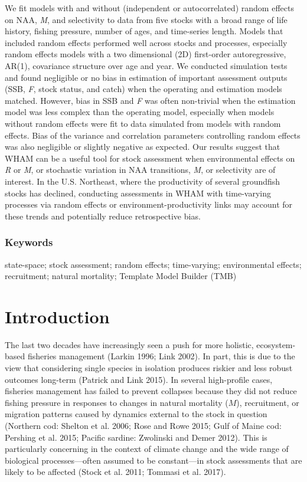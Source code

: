\documentclass[]{article}
\begin{document}
We fit models with and without (independent or autocorrelated) random
effects on NAA, \emph{M}, and selectivity to data from five stocks with
a broad range of life history, fishing pressure, number of ages, and
time-series length. Models that included random effects performed well
across stocks and processes, especially random effects models with a two
dimensional (2D) first-order autoregressive, AR(1), covariance structure
over age and year. We conducted simulation tests and found negligible or
no bias in estimation of important assessment outputs (SSB, \emph{F},
stock status, and catch) when the operating and estimation models
matched. However, bias in SSB and \emph{F} was often non-trivial when
the estimation model was less complex than the operating model,
especially when models without random effects were fit to data simulated
from models with random effects. Bias of the variance and correlation
parameters controlling random effects was also negligible or slightly
negative as expected. Our results suggest that WHAM can be a useful tool
for stock assessment when environmental effects on \emph{R} or \emph{M},
or stochastic variation in NAA transitions, \emph{M}, or selectivity are
of interest. In the U.S. Northeast, where the productivity of several
groundfish stocks has declined, conducting assessments in WHAM with
time-varying processes via random effects or environment-productivity
links may account for these trends and potentially reduce retrospective
bias.

\hypertarget{keywords}{%
\subsubsection*{Keywords}\label{keywords}}

state-space; stock assessment; random effects; time-varying;
environmental effects; recruitment; natural mortality; Template Model
Builder (TMB)

\pagebreak

\hypertarget{introduction}{%
\section{Introduction}\label{introduction}}

The last two decades have increasingly seen a push for more holistic,
ecosystem-based fisheries management (Larkin 1996; Link 2002). In part,
this is due to the view that considering single species in isolation
produces riskier and less robust outcomes long-term (Patrick and Link
2015). In several high-profile cases, fisheries management has failed to
prevent collapses because they did not reduce fishing pressure in
responses to changes in natural mortality (\(M\)), recruitment, or
migration patterns caused by dynamics external to the stock in question
(Northern cod: Shelton et al. 2006; Rose and Rowe 2015; Gulf of Maine
cod: Pershing et al. 2015; Pacific sardine: Zwolinski and Demer 2012).
This is particularly concerning in the context of climate change and the
wide range of biological processes---often assumed to be constant---in
stock assessments that are likely to be affected (Stock et al. 2011;
Tommasi et al. 2017).
\end{document}
